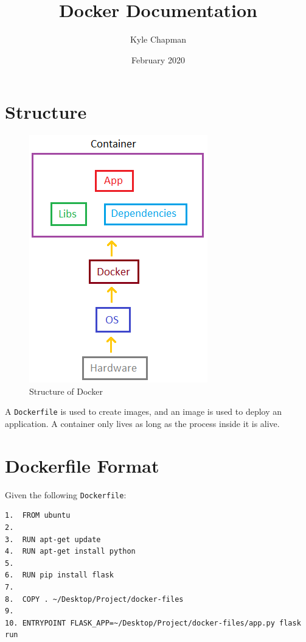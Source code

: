 \documentclass[a4paper, 12pt]{article}
\title{Docker Documentation}
\author{Kyle Chapman}
\date{February 2020}
\begin{document}
\maketitle
\tableofcontents
\clearpage

\section{Structure}

\begin{figure}[H]
	\centering
	\includegraphics[scale=0.6]{docker-setup.png}
	\caption{Structure of Docker}
\end{figure}

A \texttt{Dockerfile} is used to create images, and an image is used to deploy
an application. A container only lives as long as the process inside it is
alive.

\section{Dockerfile Format}

Given the following \texttt{Dockerfile}:

\begin{verbatim}
1.  FROM ubuntu
2.
3.  RUN apt-get update
4.  RUN apt-get install python
5.
6.  RUN pip install flask
7.
8.  COPY . ~/Desktop/Project/docker-files
9.
10. ENTRYPOINT FLASK_APP=~/Desktop/Project/docker-files/app.py flask run
\end{verbatim}
\end{document}
